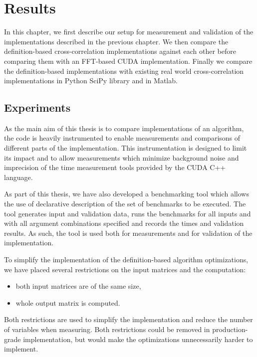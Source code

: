 \chapter{Results}
\label{sec:results}

In this chapter, we first describe our setup for measurement and validation of the implementations described in the previous chapter. We then compare the definition-based cross-correlation implementations against each other before comparing them with an FFT-based CUDA implementation. Finally we compare the definition-based implementations with existing real world cross-correlation implementations in Python SciPy library and in Matlab.

\section{Experiments}
\label{sec:experiments}
As the main aim of this thesis is to compare implementations of an algorithm, the code is heavily instrumented to enable measurements and comparisons of different parts of the implementation. This instrumentation is designed to limit its impact and to allow measurements which minimize background noise and imprecision of the time measurement tools provided by the CUDA C++ language.

As part of this thesis, we have also developed a benchmarking tool which allows the use of declarative description of the set of benchmarks to be executed. The tool generates input and validation data, runs the benchmarks for all inputs and with all argument combinations specified and records the times and validation results. As such, the tool is used both for measurements and for validation of the implementation. 

To simplify the implementation of the definition-based algorithm optimizations, we have placed several restrictions on the input matrices and the computation:
\begin{itemize}
	\item both input matrices are of the same size,
	\item whole output matrix is computed.
\end{itemize}

Both restrictions are used to simplify the implementation and reduce the number of variables when measuring. Both restrictions could be removed in production-grade implementation, but would make the optimizations unnecessarily harder to implement. 

